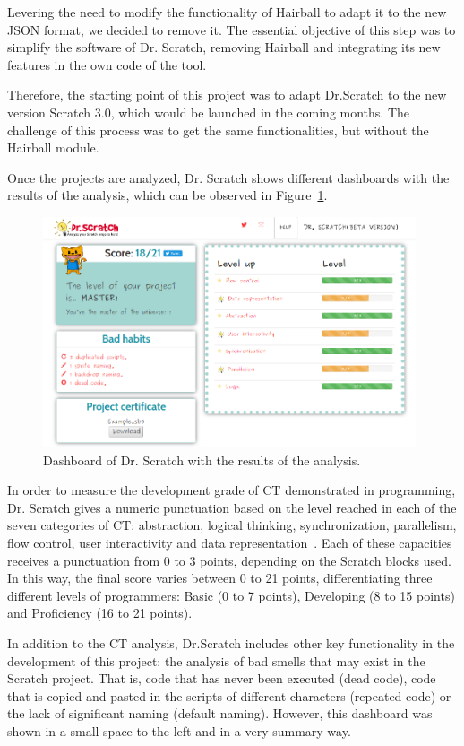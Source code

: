 Levering the need to modify the functionality of Hairball to adapt it to the new JSON format, we decided to remove it. The essential objective of this step was to simplify the software of Dr. Scratch, removing Hairball and integrating its new features in the own code of the tool. 

Therefore, the starting point of this project was to adapt Dr.Scratch to the new version Scratch 3.0, which would be launched in the coming months. The challenge of this process was to get the same functionalities, but without the Hairball module.

\hfill

Once the projects are analyzed, Dr. Scratch shows different dashboards with the results of the analysis, which can be observed in Figure~\ref{fig:dashboards}.

\begin{figure}
  \centering
  \includegraphics[width=11cm, keepaspectratio]{img/dashboards.png}
  \caption{Dashboard of Dr. Scratch with the results of the analysis.}
  \label{fig:dashboards}
\end{figure}

In order to measure the development grade of CT demonstrated in programming, Dr. Scratch gives a numeric punctuation based on the level reached in each of the seven categories of CT: abstraction, logical thinking, synchronization, parallelism, flow control, user interactivity and data representation~\cite{moreno2015dr}. Each of these capacities receives a punctuation from 0 to 3 points, depending on the Scratch blocks used. In this way, the final score varies between 0 to 21 points, differentiating three different levels of programmers: Basic (0 to 7 points), Developing (8 to 15 points) and Proficiency (16 to 21 points).   

In addition to the CT analysis, Dr.Scratch includes other key functionality in the development of this project: the analysis of bad smells that may exist in the Scratch project. That is, code that has never been executed (dead code), code that is copied and pasted in the scripts of different characters (repeated code) or the lack of significant naming (default naming). However, this dashboard was shown in a small space to the left and in a very summary way.

